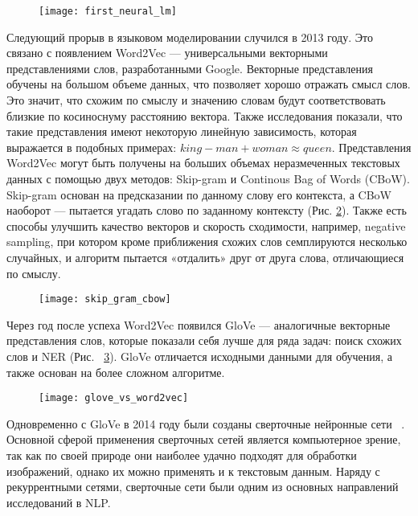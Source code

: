 \begin{figure}[ht]
\centering
	\texttt{[image: first\_neural\_lm]}
	\label{fig:first_neural_lm}
\end{figure}

Следующий прорыв в языковом моделировании случился в 2013 году. Это связано с появлением Word2Vec --- универсальными векторными представлениями слов, разработанными Google. Векторные представления обучены на большом объеме данных, что позволяет хорошо отражать смысл слов. Это значит, что схожим по смыслу и значению словам будут соответствовать близкие по косиноснуму расстоянию вектора. Также исследования показали, что такие представления имеют некоторую линейную зависимость, которая выражается в подобных примерах: $king - man + woman \approx queen$.
Представления Word2Vec могут быть получены на больших объемах неразмеченных текстовых данных с помощью двух методов: Skip-gram и Continous Bag of Words (CBoW). Skip-gram основан на предсказании по данному слову его контекста, а CBoW наоборот --- пытается угадать слово по заданному контексту (Рис. \ref{fig:skipgram_cbow}). Также есть способы улучшить качество векторов и скорость сходимости, например, negative sampling, при котором кроме приближения схожих слов семплируются несколько случайных, и алгоритм пытается «отдалить» друг от друга слова, отличающиеся по смыслу.

\begin{figure}[ht]
	\texttt{[image: skip\_gram\_cbow]}
	\label{fig:skipgram_cbow}
\end{figure}

Через год после успеха Word2Vec появился GloVe --- аналогичные векторные представления слов, которые показали себя лучше для ряда задач: поиск схожих слов и NER (Рис. ~\ref{fig:glove_vs_word2vec}). GloVe отличается исходными данными для обучения, а также основан на более сложном алгоритме.~\cite{twds-lm-history}

\begin{figure}[ht]
	\texttt{[image: glove\_vs\_word2vec]}
	\label{fig:glove_vs_word2vec}
\end{figure}

Одновременно с GloVe в 2014 году были созданы сверточные нейронные сети ~\cite{kalchbrenner-etal-2014-convolutional}. Основной сферой применения сверточных сетей является компьютерное зрение, так как по своей природе они наиболее удачно подходят для обработки изображений, однако их можно применять и к текстовым данным. Наряду с рекуррентными сетями, сверточные сети были одним из основных направлений исследований в NLP.

